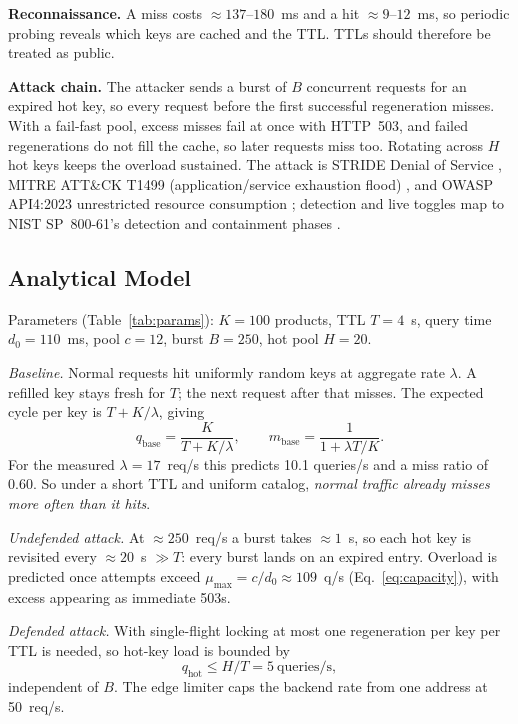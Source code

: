 \documentclass[journal]{IEEEtran}
\begin{document}
\textbf{Reconnaissance.} A miss costs ${\approx}137$--$180$~ms and a hit
${\approx}9$--$12$~ms, so periodic probing reveals which keys are cached and the TTL.
TTLs should therefore be treated as public.

\textbf{Attack chain.} The attacker sends a burst of $B$ concurrent requests for an
expired hot key, so every request before the first successful regeneration misses.
With a fail-fast pool, excess misses fail at once with HTTP~503, and failed
regenerations do not fill the cache, so later requests miss too. Rotating across $H$
hot keys keeps the overload sustained. The attack is STRIDE Denial of Service
\cite{shostack2014}, MITRE ATT\&CK T1499 (application/service exhaustion flood)
\cite{mitret1499}, and OWASP API4:2023 unrestricted resource consumption
\cite{owaspapi2023}; detection and live toggles map to NIST SP~800-61's
detection and containment phases \cite{nist80061}.

\subsection{Analytical Model}
\label{sec:model}
Parameters (Table~\ref{tab:params}): $K=100$ products, TTL $T=4$~s, query time
$d_0=110$~ms, pool $c=12$, burst $B=250$, hot pool $H=20$.

\emph{Baseline.} Normal requests hit uniformly random keys at aggregate rate
$\lambda$. A refilled key stays fresh for $T$; the next request after that misses. The
expected cycle per key is $T+K/\lambda$, giving
\begin{equation}
q_{\mathrm{base}} = \frac{K}{T + K/\lambda}, \qquad
m_{\mathrm{base}} = \frac{1}{1+\lambda T/K}.
\label{eq:baseline}
\end{equation}
For the measured $\lambda=17$~req/s this predicts 10.1 queries/s and a miss ratio of
0.60. So under a short TTL and uniform catalog, \emph{normal traffic already misses
more often than it hits}.

\emph{Undefended attack.} At ${\approx}250$~req/s a burst takes ${\approx}1$~s, so each
hot key is revisited every ${\approx}20$~s $\gg T$: every burst lands on an expired
entry. Overload is predicted once attempts exceed $\mu_{\max}=c/d_0\approx109$~q/s
(Eq.~\ref{eq:capacity}), with excess appearing as immediate 503s.

\emph{Defended attack.} With single-flight locking at most one regeneration per key per
TTL is needed, so hot-key load is bounded by
\begin{equation}
q_{\mathrm{hot}} \le H/T = 5~\text{queries/s},
\label{eq:defended}
\end{equation}
independent of $B$. The edge limiter caps the backend rate from one address at
50~req/s.
\end{document}
